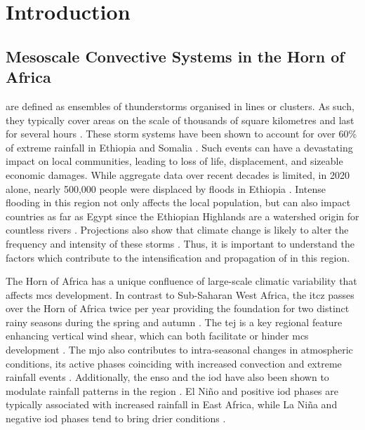 \chapter{Introduction}
\label{ch:intro}

\section{Mesoscale Convective Systems in the Horn of Africa}

 are defined as ensembles of thunderstorms organised in lines or clusters. As such, they typically cover areas on the scale of thousands of square kilometres and last for several hours \citep{Houze2004}. These storm systems have been shown to account for over 60\% of extreme rainfall in Ethiopia and Somalia \citep{Hill2023}. Such events can have a devastating impact on local communities, leading to loss of life, displacement, and sizeable economic damages. While aggregate data over recent decades is limited, in 2020 alone, nearly 500,000 people were displaced by floods in Ethiopia \citep{Mekuria2022}. Intense flooding in this region not only affects the local population, but can also impact countries as far as Egypt since the Ethiopian Highlands are a watershed origin for countless rivers \citep{Mamo2019,Legese2020,Zaroug2014}. Projections also show that climate change is likely to alter the frequency and intensity of these storms \citep{Endris2019,Das2016,Li2023}. Thus, it is important to understand the factors which contribute to the intensification and propagation of  in this region.

The Horn of Africa has a unique confluence of large-scale climatic variability that affects \acrshort{mcs} development. In contrast to Sub-Saharan West Africa, the \acrfull{itcz} passes over the Horn of Africa twice per year providing the foundation for two distinct rainy seasons during the spring and autumn \citep{Palmer2023,Tefera2025}. The \acrfull{tej} is a key regional feature enhancing vertical wind shear, which can both facilitate or hinder \acrshort{mcs} development \citep{Farnsworth2011,Vashisht2021}. The \acrfull{mjo} also contributes to intra-seasonal changes in atmospheric conditions, its active phases coinciding with increased convection and extreme rainfall events \citep{Camberlin2019,Ochieng2023,Pohl2006}. Additionally, the \acrfull{enso} and the \acrfull{iod} have also been shown to modulate rainfall patterns in the region \citep{Dubache2019,Endris2019,Vashisht2021,Zaroug2014}. El Niño and positive \acrshort{iod} phases are typically associated with increased rainfall in East Africa, while La Niña and negative \acrshort{iod} phases tend to bring drier conditions \citep{Camberlin2019,Endris2019}.

